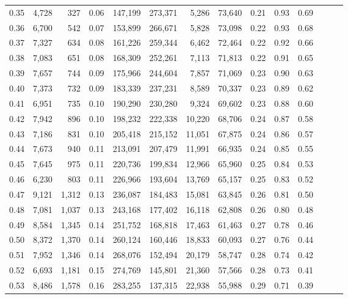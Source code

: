 \begin{tabular}{rrrrrrrrrrrrrr}
0.35 &  4,728 &    327 &  0.06 &  147,199 &  273,371 &   5,286 &  73,640 &  0.21 &  0.93 &      0.69 \\
0.36 &  6,700 &    542 &  0.07 &  153,899 &  266,671 &   5,828 &  73,098 &  0.22 &  0.93 &      0.68 \\
0.37 &  7,327 &    634 &  0.08 &  161,226 &  259,344 &   6,462 &  72,464 &  0.22 &  0.92 &      0.66 \\
0.38 &  7,083 &    651 &  0.08 &  168,309 &  252,261 &   7,113 &  71,813 &  0.22 &  0.91 &      0.65 \\
0.39 &  7,657 &    744 &  0.09 &  175,966 &  244,604 &   7,857 &  71,069 &  0.23 &  0.90 &      0.63 \\
0.40 &  7,373 &    732 &  0.09 &  183,339 &  237,231 &   8,589 &  70,337 &  0.23 &  0.89 &      0.62 \\
0.41 &  6,951 &    735 &  0.10 &  190,290 &  230,280 &   9,324 &  69,602 &  0.23 &  0.88 &      0.60 \\
0.42 &  7,942 &    896 &  0.10 &  198,232 &  222,338 &  10,220 &  68,706 &  0.24 &  0.87 &      0.58 \\
0.43 &  7,186 &    831 &  0.10 &  205,418 &  215,152 &  11,051 &  67,875 &  0.24 &  0.86 &      0.57 \\
0.44 &  7,673 &    940 &  0.11 &  213,091 &  207,479 &  11,991 &  66,935 &  0.24 &  0.85 &      0.55 \\
0.45 &  7,645 &    975 &  0.11 &  220,736 &  199,834 &  12,966 &  65,960 &  0.25 &  0.84 &      0.53 \\
0.46 &  6,230 &    803 &  0.11 &  226,966 &  193,604 &  13,769 &  65,157 &  0.25 &  0.83 &      0.52 \\
0.47 &  9,121 &  1,312 &  0.13 &  236,087 &  184,483 &  15,081 &  63,845 &  0.26 &  0.81 &      0.50 \\
0.48 &  7,081 &  1,037 &  0.13 &  243,168 &  177,402 &  16,118 &  62,808 &  0.26 &  0.80 &      0.48 \\
0.49 &  8,584 &  1,345 &  0.14 &  251,752 &  168,818 &  17,463 &  61,463 &  0.27 &  0.78 &      0.46 \\
0.50 &  8,372 &  1,370 &  0.14 &  260,124 &  160,446 &  18,833 &  60,093 &  0.27 &  0.76 &      0.44 \\
0.51 &  7,952 &  1,346 &  0.14 &  268,076 &  152,494 &  20,179 &  58,747 &  0.28 &  0.74 &      0.42 \\
0.52 &  6,693 &  1,181 &  0.15 &  274,769 &  145,801 &  21,360 &  57,566 &  0.28 &  0.73 &      0.41 \\
0.53 &  8,486 &  1,578 &  0.16 &  283,255 &  137,315 &  22,938 &  55,988 &  0.29 &  0.71 &      0.39 \\

\end{tabular}
